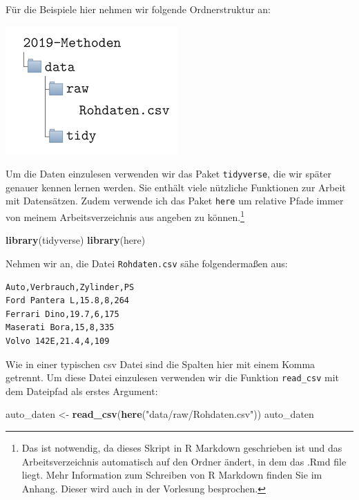\documentclass[]{tufte-book}
\newenvironment{Shaded}{}{}
\newcommand{\KeywordTok}[1]{\textcolor[rgb]{0.00,0.44,0.13}{\textbf{#1}}}
\newcommand{\StringTok}[1]{\textcolor[rgb]{0.25,0.44,0.63}{#1}}
\newcommand{\NormalTok}[1]{#1}
\begin{document}
Für die Beispiele hier nehmen wir folgende Ordnerstruktur an:

\begin{center}\includegraphics[width=0.5\linewidth]{figures/chap3-data-folder} \end{center}

Um die Daten einzulesen verwenden wir das Paket \texttt{tidyverse}, die
wir später genauer kennen lernen werden. Sie enthält viele nützliche
Funktionen zur Arbeit mit Datensätzen. Zudem verwende ich das Paket
\texttt{here} um relative Pfade immer von meinem Arbeitsverzeichnis aus
angeben zu können.\footnote{Das ist notwendig, da dieses Skript in R
  Markdown geschrieben ist und das Arbeitsverzeichnis automatisch auf
  den Ordner ändert, in dem das .Rmd file liegt. Mehr Information zum
  Schreiben von R Markdown finden Sie im Anhang. Dieser wird auch in der
  Vorlesung besprochen.}

\begin{Shaded}
\begin{Highlighting}[]
\KeywordTok{library}\NormalTok{(tidyverse)}
\KeywordTok{library}\NormalTok{(here)}
\end{Highlighting}
\end{Shaded}

Nehmen wir an, die Datei \texttt{Rohdaten.csv} sähe folgendermaßen aus:

\begin{verbatim}
Auto,Verbrauch,Zylinder,PS
Ford Pantera L,15.8,8,264
Ferrari Dino,19.7,6,175
Maserati Bora,15,8,335
Volvo 142E,21.4,4,109
\end{verbatim}

Wie in einer typischen csv Datei sind die Spalten hier mit einem Komma
getrennt. Um diese Datei einzulesen verwenden wir die Funktion
\texttt{read\_csv} mit dem Dateipfad als erstes Argument:

\begin{Shaded}
\begin{Highlighting}[]
\NormalTok{auto_daten <-}\StringTok{ }\KeywordTok{read_csv}\NormalTok{(}\KeywordTok{here}\NormalTok{(}\StringTok{"data/raw/Rohdaten.csv"}\NormalTok{))}
\NormalTok{auto_daten}
\end{Highlighting}
\end{Shaded}
\end{document}
